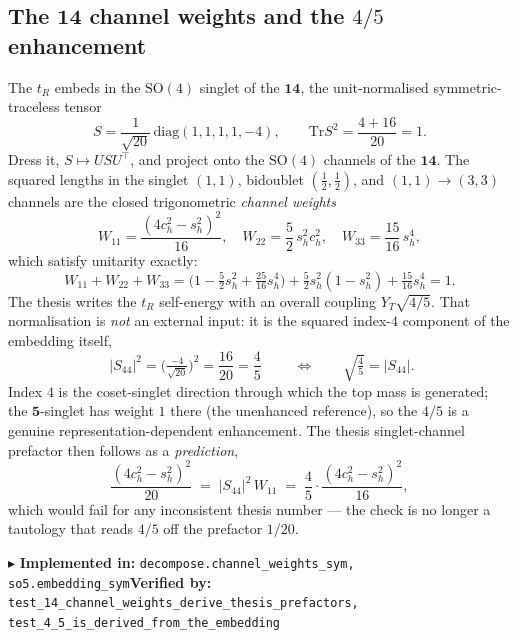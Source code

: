 \documentclass[11pt]{article}
\newcommand{\SO}[1]{\mathrm{SO}(#1)}
\newcommand{\Tr}{\mathrm{Tr}}
\newcommand{\sh}{s_h}
\newcommand{\ch}{c_h}
\newcommand{\code}[1]{\texttt{#1}}
\newcommand{\impl}[2]{\par\smallskip\noindent\textcolor{blue!60!black}{\small$\blacktriangleright$ \textbf{Implemented in:} \code{#1}\quad\textbf{Verified by:} \code{#2}}\par\smallskip}
\begin{document}
\subsection{The $\mathbf{14}$ channel weights and the $4/5$ enhancement}
\label{sec:45}
The $t_R$ embeds in the $\SO4$ singlet of the $\mathbf{14}$, the unit-normalised
symmetric-traceless tensor
\begin{equation}
  S=\frac{1}{\sqrt{20}}\,\mathrm{diag}(1,1,1,1,-4),\qquad \Tr S^2=\frac{4+16}{20}=1 .
\end{equation}
Dress it, $S\mapsto U S U^{\!\top}$, and project onto the $\SO4$ channels of the $\mathbf{14}$. The
squared lengths in the singlet $(1,1)$, bidoublet $(\tfrac12,\tfrac12)$, and $(1,1)\!\to\!(3,3)$
channels are the closed trigonometric \emph{channel weights}
\begin{equation}
  W_{11}=\frac{(4\ch^2-\sh^2)^2}{16},\quad
  W_{22}=\frac{5}{2}\,\sh^2\ch^2,\quad
  W_{33}=\frac{15}{16}\,\sh^4,
\end{equation}
which satisfy unitarity exactly:
\begin{equation}
  W_{11}+W_{22}+W_{33}
  =\Big(1-\tfrac52\sh^2+\tfrac{25}{16}\sh^4\Big)+\tfrac52\sh^2(1-\sh^2)+\tfrac{15}{16}\sh^4=1 .
\end{equation}
The thesis writes the $t_R$ self-energy with an overall coupling $Y_T\sqrt{4/5}$. That
normalisation is \emph{not} an external input: it is the squared index-$4$ component of the
embedding itself,
\begin{equation}
  \boxed{\;\big|S_{44}\big|^2=\Big(\tfrac{-4}{\sqrt{20}}\Big)^2=\frac{16}{20}=\frac45\;}
  \qquad\Longleftrightarrow\qquad \sqrt{\tfrac45}=|S_{44}| .
  \label{eq:45}
\end{equation}
Index $4$ is the coset-singlet direction through which the top mass is generated; the
$\mathbf 5$-singlet has weight $1$ there (the unenhanced reference), so the $4/5$ is a genuine
representation-dependent enhancement. The thesis singlet-channel prefactor then follows as a
\emph{prediction},
\begin{equation}
  \frac{(4\ch^2-\sh^2)^2}{20}\;=\;|S_{44}|^2\,W_{11}\;=\;\frac45\cdot\frac{(4\ch^2-\sh^2)^2}{16},
\end{equation}
which would fail for any inconsistent thesis number --- the check is no longer a tautology that
reads $4/5$ off the prefactor $1/20$.
\impl{decompose.channel\_weights\_sym, so5.embedding\_sym}{test\_14\_channel\_weights\_derive\_thesis\_prefactors, test\_4\_5\_is\_derived\_from\_the\_embedding}
\end{document}
